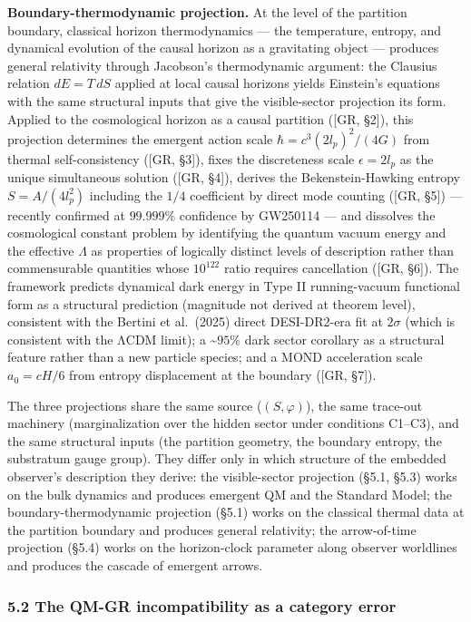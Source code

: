 \documentclass[
]{article}
\begin{document}
\textbf{Boundary-thermodynamic projection.} At the level of the
partition boundary, classical horizon thermodynamics --- the
temperature, entropy, and dynamical evolution of the causal horizon as a
gravitating object --- produces general relativity through Jacobson's
thermodynamic argument: the Clausius relation \(dE = T \, dS\) applied
at local causal horizons yields Einstein's equations with the same
structural inputs that give the visible-sector projection its form.
Applied to the cosmological horizon as a causal partition ({[}GR,
§2{]}), this projection determines the emergent action scale
\(\hbar = c^3 (2 l_p)^2 / (4G)\) from thermal self-consistency ({[}GR,
§3{]}), fixes the discreteness scale \(\epsilon = 2 l_p\) as the unique
simultaneous solution ({[}GR, §4{]}), derives the Bekenstein-Hawking
entropy \(S = A/(4 l_p^2)\) including the \(1/4\) coefficient by direct
mode counting ({[}GR, §5{]}) --- recently confirmed at \(99.999\%\)
confidence by GW250114 --- and dissolves the cosmological constant
problem by identifying the quantum vacuum energy and the effective
\(\Lambda\) as properties of logically distinct levels of description
rather than commensurable quantities whose \(10^{122}\) ratio requires
cancellation ({[}GR, §6{]}). The framework predicts dynamical dark
energy in Type II running-vacuum functional form as a structural
prediction (magnitude not derived at theorem level), consistent with the
Bertini et al.~(2025) direct DESI-DR2-era fit at \(2\sigma\) (which is
consistent with the ΛCDM limit); a \textasciitilde{}\(95\%\) dark sector
corollary as a structural feature rather than a new particle species;
and a MOND acceleration scale \(a_0 = cH/6\) from entropy displacement
at the boundary ({[}GR, §7{]}).

The three projections share the same source (\((S, \varphi)\)), the same
trace-out machinery (marginalization over the hidden sector under
conditions C1--C3), and the same structural inputs (the partition
geometry, the boundary entropy, the substratum gauge group). They differ
only in which structure of the embedded observer's description they
derive: the visible-sector projection (§5.1, §5.3) works on the bulk
dynamics and produces emergent QM and the Standard Model; the
boundary-thermodynamic projection (§5.1) works on the classical thermal
data at the partition boundary and produces general relativity; the
arrow-of-time projection (§5.4) works on the horizon-clock parameter
along observer worldlines and produces the cascade of emergent arrows.

\hypertarget{the-qm-gr-incompatibility-as-a-category-error}{%
\subsubsection{5.2 The QM-GR incompatibility as a category
error}\label{the-qm-gr-incompatibility-as-a-category-error}}
\end{document}
